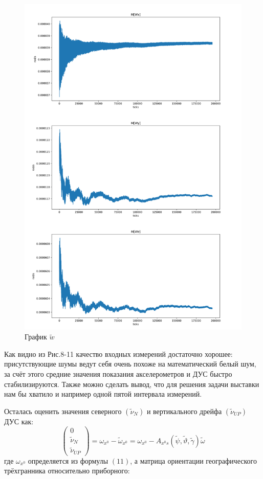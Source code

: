 \documentclass[a4paper,14pt]{article}
\theoremstyle{plain} %
\theoremstyle{definition} %
\theoremstyle{remark} %
\begin{document}
{\begin{figure}[h!]
    \centering
    \includegraphics[width=0.99\linewidth]{FullW.png}
    \caption{ График $\widetilde{w}$}
    \label{fig:mw}
\end{figure}

Как видно из Рис.8-11 качество входных измерений достаточно хорошее: присутствующие шумы ведут себя очень похоже на математический белый шум, за счёт этого средние значения показания акселерометров и ДУС быстро стабилизируются. Также можно сделать вывод, что для решения задачи выставки нам бы хватило и например одной пятой интервала измерений.

Осталась оценить значения северного $\left(\widetilde{\nu}_{N}\right)$ и вертикального дрейфа $\left(\widetilde{\nu}_{U P}\right)$ ДУС как:
$$
    \left(\begin{array}{c}
            0                   \\
            \widetilde{\nu}_{N} \\
            \widetilde{\nu}_{U P}
        \end{array}\right)=\omega_{x^{0}}-\widetilde{\omega}_{x^{0}}=\omega_{x^{0}}-A_{x^{0} s}(\widetilde{\psi}, \widetilde{\vartheta}, \widetilde{\gamma}) \widetilde{\omega}
$$
где $\omega_{x^{0}}$ определяется из формулы $(11)$, а матрица ориентации географического трёхгранника относительно приборного:

}
\end{document}
